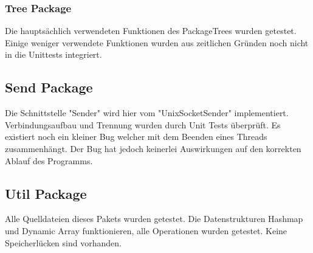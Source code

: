 		\subsubsection{Tree Package}
		Die hauptsächlich verwendeten Funktionen des PackageTrees wurden getestet. Einige weniger verwendete Funktionen wurden aus zeitlichen Gründen noch nicht in die Unittests integriert.
	
	\subsection{Send Package}
	Die Schnittstelle "Sender" wird hier vom "UnixSocketSender" implementiert. Verbindungsaufbau und Trennung wurden durch Unit Tests überprüft. Es existiert noch ein kleiner Bug welcher mit dem Beenden eines Threads zusammenhängt. Der Bug hat jedoch keinerlei Auswirkungen auf den korrekten Ablauf des Programms.
	
	\subsection{Util Package}
	Alle Quelldateien dieses Pakets wurden getestet. Die Datenstrukturen Hashmap und Dynamic Array funktionieren, alle Operationen wurden getestet. Keine Speicherlücken sind vorhanden.




